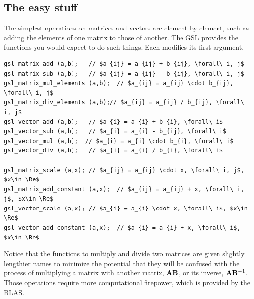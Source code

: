 \subsection{The easy stuff} The simplest operations on matrices and
vectors are element-by-element, such as adding the elements of one
matrix to those of another. The GSL provides the functions you would
expect to do such things. Each modifies its first argument.
 
 
 
 
 
 
\lstset{texcl=true} %
\begin{lstlisting}
gsl_matrix_add (a,b);   // $a_{ij} = a_{ij} + b_{ij}, \forall\ i, j$
gsl_matrix_sub (a,b);   // $a_{ij} = a_{ij} - b_{ij}, \forall\ i, j$
gsl_matrix_mul_elements (a,b);  // $a_{ij} = a_{ij} \cdot b_{ij}, \forall\ i, j$
gsl_matrix_div_elements (a,b);// $a_{ij} = a_{ij} / b_{ij}, \forall\ i, j$
gsl_vector_add (a,b);   // $a_{i} = a_{i} + b_{i}, \forall\ i$
gsl_vector_sub (a,b);   // $a_{i} = a_{i} - b_{ij}, \forall\ i$
gsl_vector_mul (a,b);  // $a_{i} = a_{i} \cdot b_{i}, \forall\ i$
gsl_vector_div (a,b);   // $a_{i} = a_{i} / b_{i}, \forall\ i$

gsl_matrix_scale (a,x); // $a_{ij} = a_{ij} \cdot x, \forall\ i, j$, $x\in \Re$
gsl_matrix_add_constant (a,x);  // $a_{ij} = a_{ij} + x, \forall\ i, j$, $x\in \Re$
gsl_vector_scale (a,x); // $a_{i} = a_{i} \cdot x, \forall\ i$, $x\in \Re$
gsl_vector_add_constant (a,x);  // $a_{i} = a_{i} + x, \forall\ i$, $x\in \Re$
\end{lstlisting}

Notice that the functions to multiply and divide two matrices are given
slightly lengthier names to minimize the potential that they will be
confused with the process of multiplying a matrix with another matrix,
${\bf A}{\bf B}$, or its inverse, 
${\bf A}{\bf B}^{-1}$. Those operations require more computational firepower, which
is provided by the BLAS.


